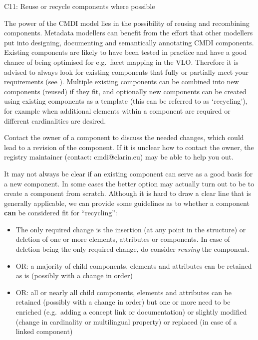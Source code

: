 C11: Reuse or recycle components where possible

 

The power of the CMDI model lies in the possibility of reusing and recombining components. Metadata modellers can benefit from the effort that other modellers put into designing, documenting and semantically annotating CMDI components. Existing components
 are likely to have been tested in practice and have a good chance of being optimised for e.g.~facet mapping in the VLO. Therefore it is advised to always look for existing components that fully or partially meet your requirements (see ). Multiple existing components can be combined into new components (reused) if they fit, and optionally new components can be created using existing components as a template (this can be referred to as `recycling'), for example when additional elements within a component are required or different cardinalities are desired.

\begin{workinprogress}
Contact the owner of a component to discuss the needed changes, which could lead to a revision of the component. If it is unclear how to contact the owner, the registry maintainer (contact: cmdi@clarin.eu) may be able to help you out.

\end{workinprogress}

It may not always be clear if an existing component can serve as a good basis for a new component. In some cases the better option may actually turn out to be to create a component from scratch. Although it is hard to draw a clear line that is generally applicable, we can provide some guidelines as to whether a component \textbf{can} be considered fit for
``recycling'':

\begin{itemize}
\tightlist
\item
  The only required change is the insertion (at any point in the structure) or deletion of one or more elements, attributes or components. In case of deletion being the only required change, do consider \emph{reusing} the component.
\item
  OR: a majority of child components, elements and attributes can be retained as is (possibly with a change in order)
\item
  OR: all or nearly all child components, elements and attributes can be retained (possibly with a change in order) but one or more need to be enriched (e.g.~adding a concept link or documentation) or slightly modified (change in cardinality or multilingual property) or replaced (in case of a linked component)
\end{itemize}

